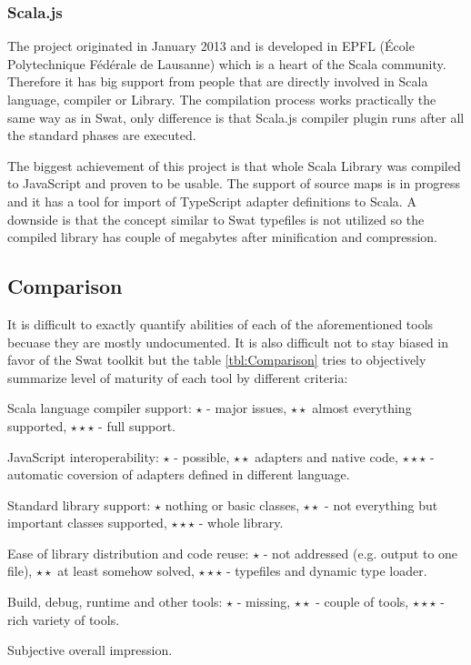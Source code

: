 \documentclass[12pt,a4paper]{report}
\begin{document}
\subsubsection*{Scala.js}

The project originated in January 2013 and is developed in EPFL (École Polytechnique Fédérale de Lausanne) which is a heart of the Scala community. Therefore it has big support from people that are directly involved in Scala language, compiler or Library. The compilation process works practically the same way as in Swat, only difference is that Scala.js compiler plugin runs after all the standard phases are executed.

The biggest achievement of this project is that whole Scala Library was compiled to JavaScript and proven to be usable. The support of source maps is in progress and it has a tool for import of TypeScript adapter definitions to Scala. A downside is that the concept similar to Swat typefiles is not utilized so the compiled library has couple of megabytes after minification and compression.

\subsection{Comparison}

It is difficult to exactly quantify abilities of each of the aforementioned tools becuase they are mostly undocumented. It is also difficult not to stay biased in favor of the Swat toolkit but the table \ref{tbl:Comparison} tries to objectively summarize level of maturity of each tool by different criteria:

\begin{description}[style=multiline,leftmargin=5cm]
\item[Compiler] Scala language compiler support: $\star$ - major issues, $\star\star$ almost everything supported, $\star\star\star$ - full support.
\item[Interoperability] JavaScript interoperability: $\star$ - possible, $\star\star$ adapters and native code, $\star\star\star$ - automatic coversion of adapters defined in different language.
\item[Libraries] Standard library support: $\star$ nothing or basic classes, $\star\star$ - not everything but important classes supported, $\star\star\star$ - whole library.
\item[Distribution] Ease of library distribution and code reuse: $\star$ - not addressed (e.g. output to one file), $\star\star$ at least somehow solved, $\star\star\star$ - typefiles and dynamic type loader.
\item[Tooling] Build, debug, runtime and other tools: $\star$ - missing, $\star\star$ - couple of tools, $\star\star\star$ - rich variety of tools.
\item[Overall] Subjective overall impression.
\end{description}
\end{document}
